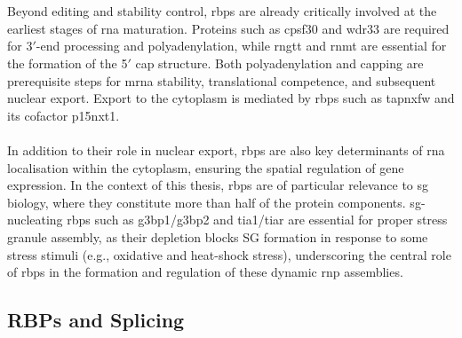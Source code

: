 \\
\\
Beyond editing and stability control, \glspl{rbp} are already critically involved at the earliest stages of \gls{rna} maturation. Proteins such as \gls{cpsf30} and \gls{wdr33} are required for 3$'$-end processing and polyadenylation\cite{liu_non-canonical_2024}, while \gls{rngtt} and \gls{rnmt} are essential for the formation of the 5$'$ cap structure\cite{liang_rna_2023}. Both polyadenylation and capping are prerequisite steps for \gls{mrna} stability, translational competence, and subsequent nuclear export\cite{van_nostrand_large-scale_2020}. Export to the cytoplasm is mediated by \glspl{rbp} such as \gls{tapnxfw} and its cofactor \gls{p15nxt1}\cite{aibara_principal_2015}.
\\
\\
In addition to their role in nuclear export, \glspl{rbp} are also key determinants of \gls{rna} localisation within the cytoplasm, ensuring the spatial regulation of gene expression\cite{gerstberger_census_2014, kelaini_rna-binding_2021, van_nostrand_large-scale_2020}. In the context of this thesis, \glspl{rbp} are of particular relevance to \gls{sg} biology, where they constitute more than half of the protein components\cite{nunes_msgp_2019}. \gls{sg}-nucleating \glspl{rbp} such as \gls{g3bp1}/\gls{g3bp2} and \gls{tia1}/\gls{tiar} are essential for proper stress granule assembly, as their depletion blocks SG formation in response to some stress stimuli (e.g., oxidative and heat-shock stress)\cite{aulas_stress-specific_2017}, underscoring the central role of \glspl{rbp} in the formation and regulation of these dynamic \gls{rnp} assemblies.

\subsection{RBPs and Splicing}

